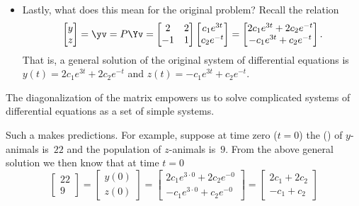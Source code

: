 \begin{itemize}
\item Lastly, what does this mean for the original problem?
Recall the relation
\begin{equation*}
\begin{bmatrix} y\\z \end{bmatrix}=\yv
=P\Yv=\begin{bmatrix} 2&2\\-1&1 \end{bmatrix}
\begin{bmatrix}c_1e^{3t}\\ c_2e^{-t} \end{bmatrix}
=\begin{bmatrix} 2c_1e^{3t}+2c_2e^{-t}
\\ -c_1e^{3t}+c_2e^{-t}\end{bmatrix}.
\end{equation*}
That is, a general solution of the original system of differential equations is \(y(t)=2c_1e^{3t}+2c_2e^{-t}\) and \(z(t)=-c_1e^{3t}+c_2e^{-t}\).

\end{itemize}
The diagonalization of the matrix empowers us to solve complicated systems of differential equations as a set of simple systems.


Such a  makes predictions. 
For example, suppose at time zero (\(t=0\)) the  () of \(y\)-animals is~\(22\) and the population of \(z\)-animals is~\(9\).
From the above general solution we then know that at time \(t=0\)
\begin{equation*}
\begin{bmatrix} 22\\9 \end{bmatrix}=
\begin{bmatrix} y(0)\\z(0) \end{bmatrix}
=\begin{bmatrix} 2c_1e^{3\cdot0}+2c_2e^{-0}
\\ -c_1e^{3\cdot0}+c_2e^{-0} \end{bmatrix}
=\begin{bmatrix} 2c_1+2c_2
\\ -c_1+c_2 \end{bmatrix}
\end{equation*}

